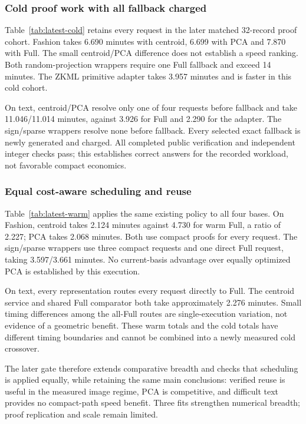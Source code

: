\subsubsection{Cold proof work with all fallback charged}
Table~\ref{tab:latest-cold} retains every request in the later matched
32-record proof cohort. Fashion takes 6.690 minutes with centroid, 6.699
with PCA and 7.870 with Full. The small centroid/PCA difference does not
establish a speed ranking. Both random-projection wrappers require one
Full fallback and exceed 14 minutes. The ZKML primitive adapter takes
3.957 minutes and is faster in this cold cohort.


On text, centroid/PCA resolve only one of four requests before fallback
and take 11.046/11.014 minutes, against 3.926 for Full and 2.290 for the
adapter. The sign/sparse wrappers resolve none before fallback. Every
selected exact fallback is newly generated and charged. All completed
public verification and independent integer checks pass; this establishes
correct answers for the recorded workload, not favorable compact economics.

\subsubsection{Equal cost-aware scheduling and reuse}
Table~\ref{tab:latest-warm} applies the same existing policy to all four
bases. On Fashion, centroid takes 2.124 minutes against 4.730 for warm
Full, a ratio of 2.227; PCA takes 2.068 minutes. Both use compact proofs
for every request. The sign/sparse wrappers use three compact requests
and one direct Full request, taking 3.597/3.661 minutes. No current-basis
advantage over equally optimized PCA is established by this execution.


On text, every representation routes every request directly to Full.
The centroid service and shared Full comparator both take approximately
2.276 minutes. Small timing differences among the all-Full routes are
single-execution variation, not evidence of a geometric benefit. These
warm totals and the cold totals have different timing boundaries and
cannot be combined into a newly measured cold crossover.

The later gate therefore extends comparative breadth and checks that
scheduling is applied equally, while retaining the same main conclusions:
verified reuse is useful in the measured image regime, PCA is competitive,
and difficult text provides no compact-path speed benefit. Three fits
strengthen numerical breadth; proof replication and scale remain limited.
